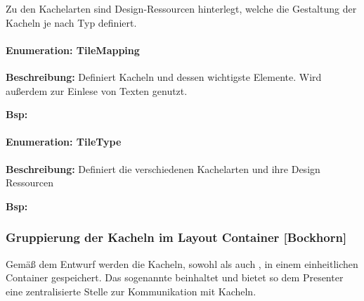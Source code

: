 Zu den Kachelarten sind Design-Ressourcen hinterlegt, welche die Gestaltung der Kacheln je nach Typ definiert.

\paragraph{Enumeration: TileMapping}

\textbf{Beschreibung: }Definiert Kacheln und dessen wichtigste Elemente. Wird außerdem zur Einlese von Texten genutzt.

\textbf{Bsp:} 

\paragraph{Enumeration: TileType}

\textbf{Beschreibung: }Definiert die verschiedenen Kachelarten und ihre Design Ressourcen

\textbf{Bsp:} 

\subsubsection{Gruppierung der Kacheln im Layout Container [Bockhorn]}
Gemäß dem Entwurf werden die Kacheln, sowohl  als auch , in einem einheitlichen Container gespeichert. Das sogenannte  beinhaltet und bietet so dem Presenter eine zentralisierte Stelle zur Kommunikation mit Kacheln.

